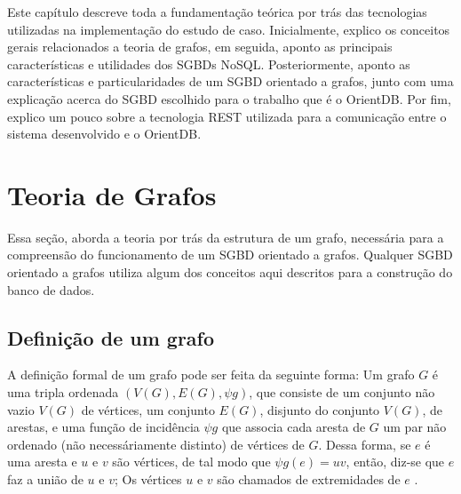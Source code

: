 \newcommand{\texCommand}[1]{\texttt{\textbackslash{#1}}}%

\newcommand{\exemplo}[1]{%
\vspace{\baselineskip}%
\noindent\fbox{\begin{minipage}{\textwidth}#1\end{minipage}}%
\\\vspace{\baselineskip}}%

\newcommand{\exemploVerbatim}[1]{%
\vspace{\baselineskip}%
\noindent\fbox{\begin{minipage}{\textwidth}%
#1\end{minipage}}%
\\\vspace{\baselineskip}}%

Este capítulo descreve toda a fundamentação teórica por trás das tecnologias utilizadas na implementação do estudo de caso. Inicialmente, explico os conceitos gerais relacionados a teoria de grafos, em seguida, aponto as principais características e utilidades dos SGBDs NoSQL. Posteriormente, aponto as características e particularidades de um SGBD orientado a grafos, junto com uma explicação acerca do SGBD escolhido para o trabalho que é o OrientDB. Por fim, explico um pouco sobre a tecnologia REST utilizada para a comunicação entre o sistema desenvolvido e o OrientDB.

\section{Teoria de Grafos} \label{graph_theory}
	Essa seção, aborda a teoria por trás da estrutura de um grafo, necessária para a compreensão do funcionamento de um SGBD orientado a grafos. Qualquer SGBD orientado a grafos utiliza algum dos conceitos aqui descritos para a construção do banco de dados.

\subsection{Definição de um grafo}
	A definição formal de um grafo pode ser feita da seguinte forma: Um grafo \(G\) é uma tripla ordenada \((V(G), E(G), \psi g)\), que consiste de um conjunto não vazio \(V(G)\) de vértices, um conjunto \(E(G)\), disjunto do conjunto \(V(G)\), de arestas, e uma função de incidência \(\psi g\) que associa cada aresta de \(G\) um par não ordenado (não necessáriamente distinto) de vértices de \(G\). Dessa forma, se \(e\) é uma aresta e \(u\) e \(v\) são vértices, de tal modo que \(\psi g(e) = uv\), então, diz-se que \(e\) faz a união de \(u\) e \(v\); Os vértices \(u\) e \(v\) são chamados de extremidades de \(e\) \cite{bondy1976graph}.
	
